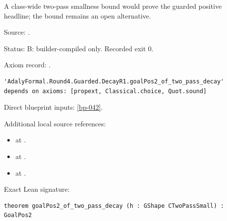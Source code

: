 \begin{theorem}[bp-044]
\label{bp-044}
\leanok
A class-wide two-pass smallness bound would prove the guarded positive headline; the bound remains an open alternative.

\par Source: \texttt{}.
\par Status: B: builder-compiled only. Recorded exit 0.
\par Axiom record: \texttt{}.
\begin{verbatim}
'AdalyFormal.Round4.Guarded.DecayR1.goalPos2_of_two_pass_decay' depends on axioms: [propext, Classical.choice, Quot.sound]
\end{verbatim}
\par Direct blueprint inputs: \ref{bp-042}.
\par Additional local source references:
\begin{itemize}
\item \texttt{} at \texttt{}.
\item \texttt{} at \texttt{}.
\item \texttt{} at \texttt{}.
\end{itemize}
\par Exact Lean signature:
\begin{verbatim}
theorem goalPos2_of_two_pass_decay (h : GShape CTwoPassSmall) : GoalPos2
\end{verbatim}
\end{theorem}


